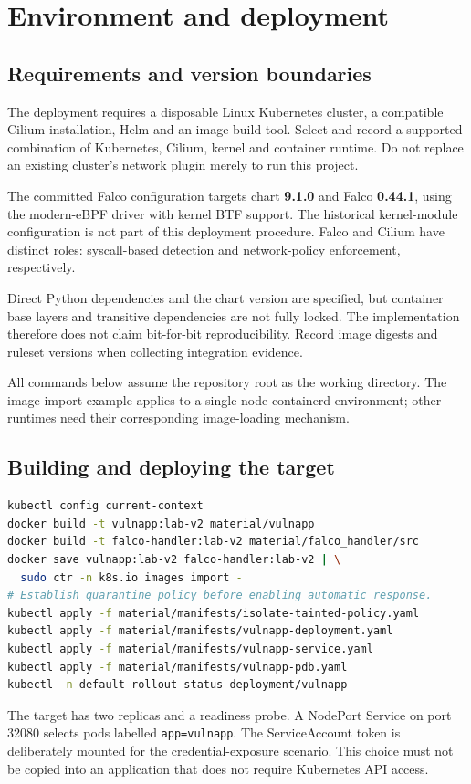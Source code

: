 \chapter{Environment and deployment}
\label{ch:ch2}
\section{Requirements and version boundaries}
The deployment requires a disposable Linux Kubernetes cluster, a compatible Cilium
installation, Helm and an image build tool. Select and record a supported combination
of Kubernetes, Cilium, kernel and container runtime. Do not replace an existing
cluster's network plugin merely to run this project.

The committed Falco configuration targets chart \textbf{9.1.0} and Falco
\textbf{0.44.1}, using the modern-eBPF driver with kernel BTF support. The historical
kernel-module configuration is not part of this deployment procedure. Falco and
Cilium have distinct roles: syscall-based detection and network-policy enforcement,
respectively.

Direct Python dependencies and the chart version are specified, but container base
layers and transitive dependencies are not fully locked. The implementation therefore
does not claim bit-for-bit reproducibility. Record image digests and ruleset versions
when collecting integration evidence.

All commands below assume the repository root as the working directory. The image
import example applies to a single-node containerd environment; other runtimes need
their corresponding image-loading mechanism.

\section{Building and deploying the target}
\begin{lstlisting}[language=bash]
kubectl config current-context
docker build -t vulnapp:lab-v2 material/vulnapp
docker build -t falco-handler:lab-v2 material/falco_handler/src
docker save vulnapp:lab-v2 falco-handler:lab-v2 | \
  sudo ctr -n k8s.io images import -
# Establish quarantine policy before enabling automatic response.
kubectl apply -f material/manifests/isolate-tainted-policy.yaml
kubectl apply -f material/manifests/vulnapp-deployment.yaml
kubectl apply -f material/manifests/vulnapp-service.yaml
kubectl apply -f material/manifests/vulnapp-pdb.yaml
kubectl -n default rollout status deployment/vulnapp
\end{lstlisting}
The target has two replicas and a readiness probe. A NodePort Service on port 32080
selects pods labelled \texttt{app=vulnapp}. The ServiceAccount token is deliberately
mounted for the credential-exposure scenario. This choice must not be copied into
an application that does not require Kubernetes API access.

